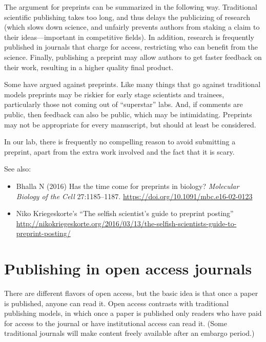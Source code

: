 \documentclass[letterpaper,oneside,11pt,article, portrait]{memoir}
\newcommand{\journal}[1]{\textit{#1}} 			%
\begin{document}
The argument for preprints can be summarized in the following way. Traditional scientific publishing takes too long, and thus delays the publicizing of research (which slows down science, and unfairly prevents authors from staking a claim to their ideas---important in competitive fields). In addition, research is frequently published in journals that charge for access, restricting who can benefit from the science. Finally, publishing a preprint may allow authors to get faster feedback on their work, resulting in a higher quality final product.

Some have argued against preprints. Like many things that go against traditional models preprints may be riskier for early stage scientists and trainees, particularly those not coming out of ``superstar'' labs. And, if comments are public, then feedback can also be public, which may be intimidating. Preprints may not be appropriate for every manuscript, but should at least be considered. 

In our lab, there is frequently no compelling reason to avoid submitting a preprint, apart from the extra work involved and the fact that it is scary.

\vspace{1em} \noindent See also:

\begin{itemize}
\item Bhalla N (2016) Has the time come for preprints in biology? \journal{Molecular Biology of the Cell} 27:1185--1187. \url{https://doi.org/10.1091/mbc.e16-02-0123}
\item Niko Kriegeskorte's ``The selfish scientist's guide to preprint posting'' \url{http://nikokriegeskorte.org/2016/03/13/the-selfish-scientists-guide-to-preprint-posting/}
\end{itemize}


\chapter{Publishing in open access journals} \label{openaccess}

There are different flavors of open access, but the basic idea is that once a paper is published, anyone can read it. Open access contrasts with traditional publishing models, in which once a paper is published only readers who have paid for access to the journal or have institutional access can read it. (Some traditional journals will make content freely available after an embargo period.)
\end{document}
